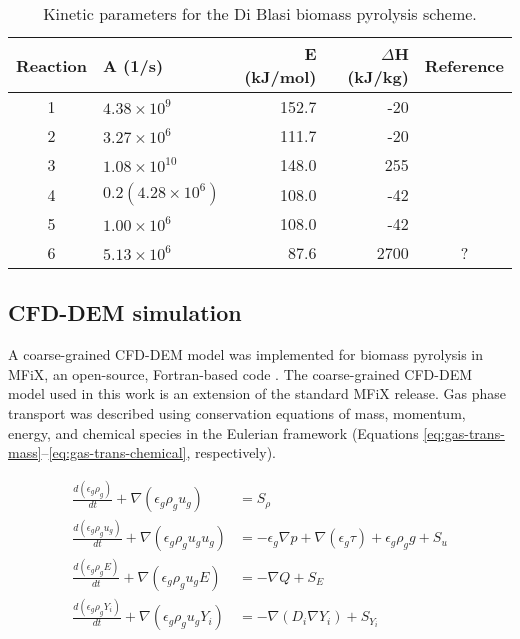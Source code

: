 \begin{table}[H]
    \centering
    \caption{Kinetic parameters for the Di Blasi biomass pyrolysis scheme.}
    \begin{tabular}{clrrc}
        \toprule
        Reaction    & A (1/s)               & E (kJ/mol) & $\Delta$H (kJ/kg) & Reference \\
        \midrule
        1           & $4.38 \times 10^9$    & 152.7      & -20               & \cite{Blasi-2001} \\
        2           & $3.27 \times 10^6$    & 111.7      & -20               & \cite{Blasi-2001} \\
        3           & $1.08 \times 10^{10}$ & 148.0      & 255               & \cite{Blasi-2001} \\
        4           & $0.2\left( 4.28 \times 10^6 \right)$    & 108.0      & -42               & \cite{Blasi-1993} \\
        5           & $1.00 \times 10^6$    & 108.0      & -42               & \cite{Blasi-1993} \\
        6           & $5.13 \times 10^6$    & 87.6       & 2700              & ? \\
        \bottomrule
    \end{tabular}
    \label{tab:kinetic-params}
\end{table}


\subsection{CFD-DEM simulation}

A coarse-grained CFD-DEM model was implemented for biomass pyrolysis in MFiX, an open-source, Fortran-based code \cite{Syamlal-1993}. The coarse-grained CFD-DEM model used in this work is an extension of the standard MFiX release. Gas phase transport was described using conservation equations of mass, momentum, energy, and chemical species in the Eulerian framework (Equations \ref{eq:gas-trans-mass}--\ref{eq:gas-trans-chemical}, respectively).

\begin{align}
    \frac{d(\epsilon_g \rho_g)}{dt} + \nabla (\epsilon_g \rho_g u_g) &= S_\rho \label{eq:gas-trans-mass} \\
    \frac{d(\epsilon_g \rho_g u_g)}{dt} + \nabla (\epsilon_g \rho_g u_g u_g) &= -\epsilon_g \nabla p + \nabla (\epsilon_g \tau) + \epsilon_g \rho_g g + S_u \\
    \frac{d(\epsilon_g \rho_g E)}{dt} + \nabla (\epsilon_g \rho_g u_g E) &= -\nabla Q + S_E \\
    \frac{d(\epsilon_g \rho_g Y_i)}{dt} + \nabla (\epsilon_g \rho_g u_g Y_i) &= -\nabla (D_i \nabla Y_i) + S_{Y_i} \label{eq:gas-trans-chemical}
\end{align}

